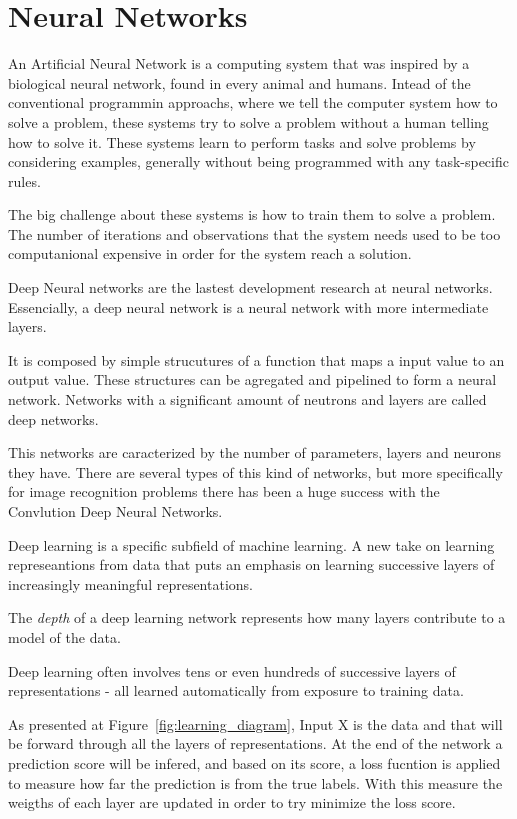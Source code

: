\chapter{Neural Networks}

An Artificial Neural Network is a computing system that was inspired by a biological neural network, found in every animal and humans.
Intead of the conventional programmin approachs, where we tell the computer system how to solve a problem, these systems try to solve a problem without a human telling how to solve it.
These systems learn to perform tasks and solve problems by considering examples, generally without being programmed with any task-specific rules.

The big challenge about these systems is how to train them to solve a problem. The number of iterations and observations that the system needs used to be too computanional expensive in order for the system reach a solution.

Deep Neural networks are the lastest development research at neural networks. Essencially, a deep neural network is a neural network with more intermediate layers.

It is composed by simple strucutures of a function that maps a input value to an output value. These structures can be agregated and pipelined to form a neural network. Networks with a significant amount of neutrons and layers are called deep networks.

This networks are caracterized by the number of parameters, layers and neurons they have.
There are several types of this kind of networks, but more specifically for image recognition problems there has been a huge success with the Convlution Deep Neural Networks. 

Deep learning is a specific subfield of machine learning. A new take on learning represeantions from data that puts an emphasis on learning successive layers of increasingly meaningful representations. 

The \emph{depth} of a deep learning network represents how many layers contribute to a model of the data.

Deep learning often involves tens or even hundreds of successive layers of representations - all learned automatically from exposure to training data.

As presented at Figure~\ref{fig:learning_diagram}, Input X is the data and that will be forward through all the layers of representations. At the end of the network a prediction score will be infered, and based on its score, a loss fucntion is applied to measure how far the prediction is from the true labels. With this measure the weigths of each layer are updated in order to try minimize the loss score.

